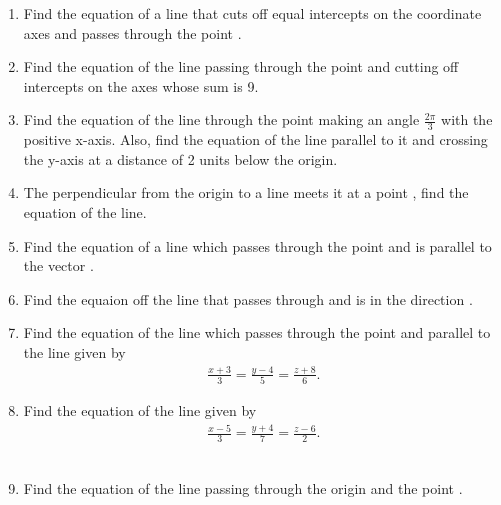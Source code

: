 \begin{enumerate}[label=\arabic*.,ref=\thesubsection.\theenumi]
\item Find the equation of a line that cuts off equal intercepts on the coordinate axes and passes through the point .
\item Find the equation of the line passing through the point  and cutting off intercepts on the axes whose sum is 9.
\item Find the equation of the line through the point  making an angle $\frac{2\pi}{3}$ with the positive x-axis.  Also, find the equation of the line parallel to it and crossing the y-axis at a distance of 2 units below the origin.
\item The perpendicular from the origin to a line meets it at a point , find the equation of the line.
\item Find the equation of a line which passes through the point  and is parallel to the vector .
\\
\solution

\item Find the equaion off the line that passes through  and is in the direction .
\\
\solution

\item Find the equation of the line which passes through  the point  and parallel to the line given by 
\begin{align}
\frac{x+3}{3} = \frac{y-4}{5} = \frac{z+8}{6}. 
\end{align}
\item Find the equation of the line given by 
\begin{align}
\frac{x-5}{3} = \frac{y+4}{7} = \frac{z-6}{2}. 
\end{align}
\\
\solution

\item Find the equation of the line passing through the origin and the point .

\end{enumerate}
